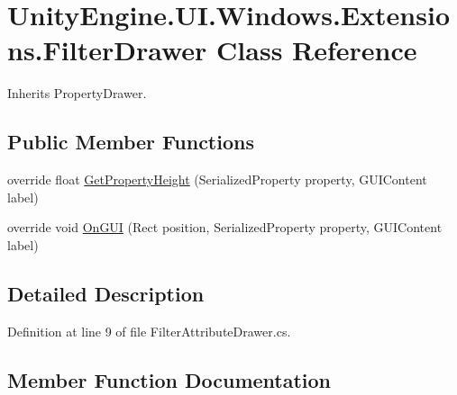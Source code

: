 \hypertarget{class_unity_engine_1_1_u_i_1_1_windows_1_1_extensions_1_1_filter_drawer}{}\section{Unity\+Engine.\+U\+I.\+Windows.\+Extensions.\+Filter\+Drawer Class Reference}
\label{class_unity_engine_1_1_u_i_1_1_windows_1_1_extensions_1_1_filter_drawer}


Inherits Property\+Drawer.

\subsection*{Public Member Functions}
\begin{DoxyCompactItemize}
\item 
override float \hyperlink{class_unity_engine_1_1_u_i_1_1_windows_1_1_extensions_1_1_filter_drawer_a32b311b0b54f941376b65bc4b8215ab9}{Get\+Property\+Height} (Serialized\+Property property, G\+U\+I\+Content label)
\item 
override void \hyperlink{class_unity_engine_1_1_u_i_1_1_windows_1_1_extensions_1_1_filter_drawer_a9660c934da398b2db674c8265b4f617a}{On\+G\+U\+I} (Rect position, Serialized\+Property property, G\+U\+I\+Content label)
\end{DoxyCompactItemize}


\subsection{Detailed Description}


Definition at line 9 of file Filter\+Attribute\+Drawer.\+cs.



\subsection{Member Function Documentation}
\hypertarget{class_unity_engine_1_1_u_i_1_1_windows_1_1_extensions_1_1_filter_drawer_a32b311b0b54f941376b65bc4b8215ab9}{}
